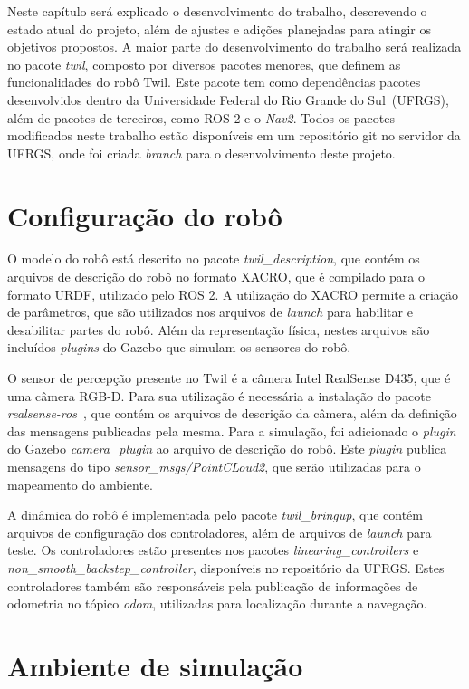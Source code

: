\documentclass[repeatfields,xlists,xpacks,oneside,yearsonly]{ufrgscca}
\begin{document}
Neste capítulo será explicado o desenvolvimento do trabalho, descrevendo o
estado atual do projeto, além de ajustes e adições planejadas para atingir
os objetivos propostos.
A maior parte do desenvolvimento do trabalho será realizada no pacote \textit{twil},
composto por diversos pacotes menores, que definem as funcionalidades do robô Twil.
Este pacote tem como dependências pacotes desenvolvidos dentro da
Universidade Federal do Rio Grande do Sul~(UFRGS), além de pacotes de
terceiros, como ROS 2 e o \textit{Nav2}.
Todos os pacotes modificados neste trabalho estão disponíveis em um repositório git
no servidor da UFRGS, onde foi criada \textit{branch} para o desenvolvimento
deste projeto.

\section{Configuração do robô}

O modelo do robô está descrito no pacote \textit{twil\_description}, que contém
os arquivos de descrição do robô no formato XACRO, que é compilado para o formato
URDF, utilizado pelo ROS 2.
A utilização do XACRO permite a criação de parâmetros, que são utilizados nos
arquivos de \textit{launch} para habilitar e desabilitar partes do robô.
Além da representação física, nestes arquivos são incluídos \textit{plugins}
do Gazebo que simulam os sensores do robô.

O sensor de percepção presente no Twil é a câmera Intel RealSense D435, que
é uma câmera RGB-D.
Para sua utilização é necessária a instalação do pacote
\textit{realsense-ros}~\cite{realsense_ros}, que contém os arquivos de
descrição da câmera, além da definição das mensagens publicadas pela mesma.
Para a simulação, foi adicionado o \textit{plugin} do Gazebo
\textit{camera\_plugin} ao arquivo de descrição do robô.
Este \textit{plugin} publica mensagens do tipo \textit{sensor\_msgs/PointCLoud2}, que
serão utilizadas para o mapeamento do ambiente.

A dinâmica do robô é implementada pelo pacote \textit{twil\_bringup},
que contém arquivos de configuração dos controladores, além de arquivos de
\textit{launch} para teste.
Os controladores estão presentes nos pacotes \textit{linearing\_controllers} e
\textit{non\_smooth\_backstep\_controller}, disponíveis no repositório da UFRGS.
Estes controladores também são responsáveis pela publicação de
informações de odometria no tópico \textit{odom}, utilizadas para localização
durante a navegação.

\section{Ambiente de simulação}
\end{document}
